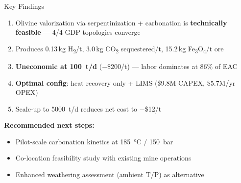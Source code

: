 \documentclass[aspectratio=169]{beamer}
\begin{document}
\begin{frame}{Key Findings}

\begin{enumerate}
\item Olivine valorization via serpentinization + carbonation is \textbf{technically feasible} --- 4/4 GDP topologies converge
\item Produces 0.13\,kg H\textsubscript{2}/t, 3.0\,kg CO\textsubscript{2} sequestered/t, 15.2\,kg Fe\textsubscript{3}O\textsubscript{4}/t ore
\item \textcolor{cost}{\textbf{Uneconomic at \SI{100}{t/d}}} ($-$\$200/t) --- labor dominates at 86\% of EAC
\item \textbf{Optimal config}: heat recovery only + LIMS (\$9.8M CAPEX, \$5.7M/yr OPEX)
\item Scale-up to \SI{5000}{t/d} reduces net cost to $-$\$12/t
\end{enumerate}

\vspace{1em}
\textbf{Recommended next steps:}
\begin{itemize}
\item Pilot-scale carbonation kinetics at \SI{185}{\celsius} / \SI{150}{bar}
\item Co-location feasibility study with existing mine operations
\item Enhanced weathering assessment (ambient T/P) as alternative
\end{itemize}
\end{frame}

\closingSlide
\end{document}
